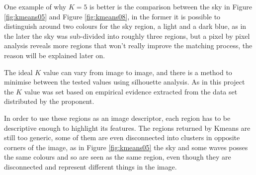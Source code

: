 \documentclass[12pt,a4paper]{article}
\begin{document}
	One example of why $K = 5$ is better is the comparison between the sky in Figure \ref{fig:kmeans05} and Figure \ref{fig:kmeans08}, in the former it is possible to distinguish around two colours for the sky region, a light and a dark blue, as in the later the sky was sub-divided into roughly three regions, but a pixel by pixel analysis reveals more regions that won't really improve the matching process, the reason will be explained later on.

	The ideal $K$ value can vary from image to image, and there is a method to minimise between the tested values using silhouette analysis. As in this project the $K$ value was set based on empirical evidence extracted from the data set distributed by the proponent.

	In order to use these regions as an image descriptor, each region has to be descriptive enough to highlight its features. The regions returned by Kmeans are still too generic, some of them are even disconnected into clusters in opposite corners of the image, as in Figure \ref{fig:kmeans05} the sky and some waves posses the same colours and so are seen as the same region, even though they are disconnected and represent different things in the image.

\newpage
\end{document}
